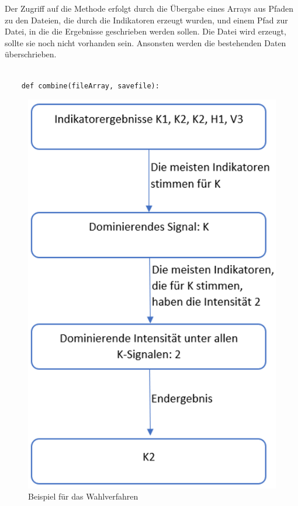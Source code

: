 Der Zugriff auf die Methode erfolgt durch die Übergabe eines Arrays aus Pfaden zu den Dateien, die durch die Indikatoren erzeugt wurden, und einem Pfad zur Datei, in die die Ergebnisse geschrieben werden sollen. Die Datei wird erzeugt, sollte sie noch nicht vorhanden sein. Ansonsten werden die bestehenden Daten überschrieben.
\begin{lstlisting}[breakatwhitespace=false, breaklines=true]

	def combine(fileArray, savefile):

\end{lstlisting}
\begin{figure}[h]
  \centering
  \includegraphics[width=\linewidth]{wahlverfahren}
  \caption{Beispiel für das Wahlverfahren}
  \label{exampleElection}
\end{figure}
